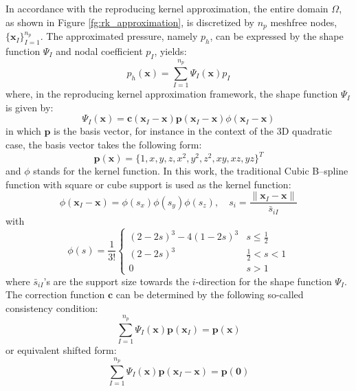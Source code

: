 In accordance with the reproducing kernel approximation, the entire domain $\Omega$, as shown in Figure \ref{fg:rk_approximation}, is discretized by $n_p$ meshfree nodes, $\{\boldsymbol{x}_I\}_{I=1}^{n_p}$. The approximated pressure, namely $p_h$, can be expressed by the shape function $\Psi_I$ and nodal coefficient $p_I$, yields:
\begin{equation}
p_h(\boldsymbol{x}) = \sum_{I=1}^{n_p} \Psi_I(\boldsymbol{x}) p_I
\end{equation}
where, in the reproducing kernel approximation framework, the shape function $\Psi_I$ is given by:
\begin{equation}\label{rkshape}
\Psi_I(\boldsymbol{x}) = \boldsymbol{c}(\boldsymbol{x}_I-\boldsymbol{x}) \boldsymbol{p}(\boldsymbol{x}_I-\boldsymbol{x}) \phi(\boldsymbol{x}_I - \boldsymbol{x})
\end{equation}
in which $\boldsymbol{p}$ is the basis vector, for instance in the context of the 3D quadratic case, the basis vector takes the following form:
\begin{equation}
\boldsymbol{p}(\boldsymbol{x}) = \{ 1, x, y, z, x^2, y^2, z^2, xy, xz, yz\}^T
\end{equation}
and $\phi$ stands for the kernel function. In this work, the traditional Cubic B--spline function with square or cube support is used as the kernel function:
\begin{equation}
\phi(\boldsymbol{x}_I-\boldsymbol{x}) = \phi(s_x) \phi(s_y) \phi(s_z), \quad s_i = \frac{\|\boldsymbol{x}_I - \boldsymbol{x}\|}{\bar{s}_{iI}}
\end{equation}
with
\begin{equation}
\phi(s) = \frac{1}{3!} \begin{cases}
(2-2s)^3 - 4(1-2s)^3 & s\le\frac{1}{2} \\
(2-2s)^3 &\frac{1}{2}<s<1 \\
0 & s> 1
\end{cases}
\end{equation}
where $\bar{s}_{iI}$'s are the support size towards the $i$-direction for the shape function $\Psi_I$. The correction function $\boldsymbol{c}$ can be determined by the following so-called consistency condition:
\begin{equation}\label{cc1}
\sum_{I=1}^{n_p} \Psi_I(\boldsymbol{x}) \boldsymbol{p}(\boldsymbol{x}_I) = \boldsymbol{p} (\boldsymbol{x})
\end{equation}
or equivalent shifted form:
\begin{equation}\label{cc2}
\sum_{I=1}^{n_p} \Psi_I(\boldsymbol{x}) \boldsymbol{p}(\boldsymbol{x}_I-\boldsymbol{x}) = \boldsymbol{p} (\boldsymbol{0})
\end{equation}
 \DIFaddbegin {}


